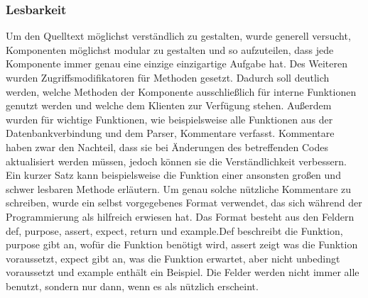 \subsubsection{Lesbarkeit}
Um den Quelltext möglichst verständlich zu gestalten, wurde generell versucht, Komponenten möglichst modular zu gestalten und so aufzuteilen, dass jede Komponente immer genau eine einzige einzigartige Aufgabe hat. %
Des Weiteren wurden Zugriffsmodifikatoren für Methoden gesetzt. Dadurch soll deutlich werden, welche Methoden der Komponente ausschließlich für interne Funktionen genutzt werden und welche dem Klienten zur Verfügung stehen.%
Außerdem wurden für wichtige Funktionen, wie beispielsweise alle Funktionen aus der Datenbankverbindung und dem Parser, Kommentare verfasst. %
	Kommentare haben zwar den Nachteil, dass sie bei Änderungen des betreffenden Codes aktualisiert werden müssen, jedoch können sie die Verständlichkeit verbessern. Ein kurzer Satz kann beispielsweise die Funktion einer ansonsten großen und schwer lesbaren Methode erläutern. %
	Um genau solche nützliche Kommentare zu schreiben, wurde ein selbst vorgegebenes Format verwendet, das sich während der Programmierung als hilfreich erwiesen hat. Das Format besteht aus den Feldern \glqq def\grqq{}, \glqq purpose\grqq{}, \glqq assert\grqq{}, \glqq expect\grqq{}, \glqq return\grqq{} und \glqq example\grqq{}.\glqq Def\grqq{} beschreibt die Funktion, \glqq purpose\grqq{} gibt an, wofür die Funktion benötigt wird, \glqq assert\grqq{} zeigt was die Funktion voraussetzt, \glqq expect\grqq{} gibt an, was die Funktion erwartet, aber nicht unbedingt voraussetzt und \glqq example\grqq{} enthält ein Beispiel. Die Felder werden nicht immer alle benutzt, sondern nur dann, wenn es als nützlich erscheint.\newline%

